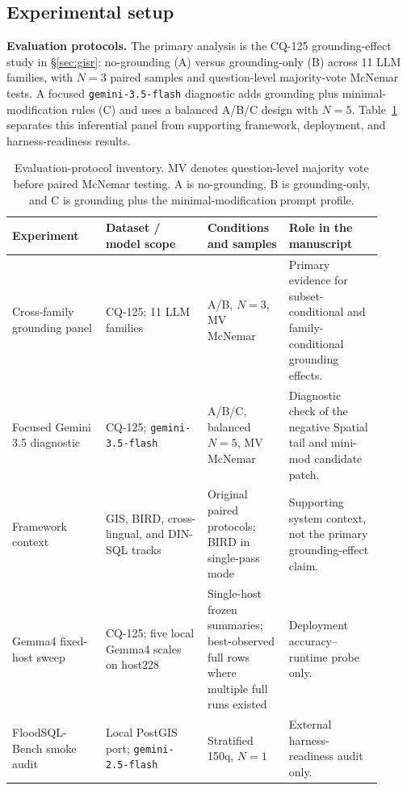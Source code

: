 
\subsection{Experimental setup}

\noindent\textbf{Evaluation protocols.} The primary analysis is the CQ-125 grounding-effect study in \S\ref{sec:gisr}: no-grounding (A) versus grounding-only (B) across 11 LLM families, with $N{=}3$ paired samples and question-level majority-vote McNemar tests. A focused \texttt{gemini-3.5-flash} diagnostic adds grounding plus minimal-modification rules (C) and uses a balanced A/B/C design with $N{=}5$. Table~\ref{tab:protocol-inventory} separates this inferential panel from supporting framework, deployment, and harness-readiness results.

\begin{table}[t]
\centering
\footnotesize
\caption{Evaluation-protocol inventory. MV denotes question-level majority vote before paired McNemar testing. A is no-grounding, B is grounding-only, and C is grounding plus the minimal-modification prompt profile.}
\label{tab:protocol-inventory}
{\setlength{\tabcolsep}{4pt}
\begin{tabular}{p{0.23\linewidth}p{0.25\linewidth}p{0.20\linewidth}p{0.23\linewidth}}
\toprule
Experiment & Dataset / model scope & Conditions and samples & Role in the manuscript \\
\midrule
Cross-family grounding panel & CQ-125; 11 LLM families & A/B, $N{=}3$, MV McNemar & Primary evidence for subset-conditional and family-conditional grounding effects. \\
Focused Gemini 3.5 diagnostic & CQ-125; \texttt{gemini-3.5-flash} & A/B/C, balanced $N{=}5$, MV McNemar & Diagnostic check of the negative Spatial tail and mini-mod candidate patch. \\
Framework context & GIS, BIRD, cross-lingual, and DIN-SQL tracks & Original paired protocols; BIRD in single-pass mode & Supporting system context, not the primary grounding-effect claim. \\
Gemma4 fixed-host sweep & CQ-125; five local Gemma4 scales on host228 & Single-host frozen summaries; best-observed full rows where multiple full runs existed & Deployment accuracy--runtime probe only. \\
FloodSQL-Bench smoke audit & Local PostGIS port; \texttt{gemini-2.5-flash} & Stratified 150q, $N{=}1$ & External harness-readiness audit only. \\
\bottomrule
\end{tabular}
}
\end{table}

